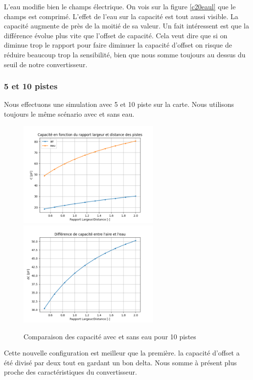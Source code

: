 L'eau modifie bien le champs électrique. On vois sur la figure \ref{c20eaul} que le champs est comprimé. L'effet de l'eau sur la capacité est tout aussi visible. La capacité augmente de près de la moitié de sa valeur. Un fait intéressent est que la différence évolue plus vite que l'offset de capacité. Cela veut dire que si on diminue trop le rapport pour faire diminuer la capacité d'offset on risque de réduire beaucoup trop la sensibilité, bien que nous somme toujours au dessus du seuil de notre convertisseur.

\subsubsection{5 et 10 pistes}
Nous effectuons une simulation avec 5 et 10 piste sur la carte. Nous utilisons toujours le même scénario avec et sans eau.


\begin{figure}[!ht]
 \centering
 \includegraphics[width=7cm]{C10Graph1.png}
 \includegraphics[width=7cm]{C10Graph2.png}
 \caption{Comparaison des capacité avec et sans eau pour 10 pistes}
\end{figure}

Cette nouvelle configuration est meilleur que la première. la capacité d'offset a été divisé par deux tout en gardant un bon delta. Nous somme à présent plus proche des caractéristiques du convertisseur.

